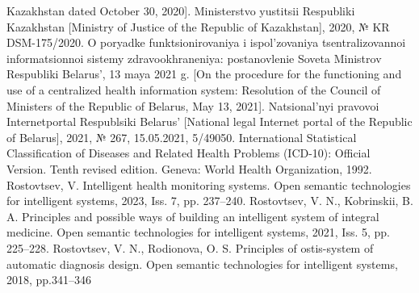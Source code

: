 \documentclass[10pt, a4paper]{article}
\begin{document}
\begin{multicols}{2}
\begin{thebibliography}{15}
        Kazakhstan dated October 30, 2020]. Ministerstvo yustitsii
        Respubliki Kazakhstan [Ministry of Justice of the Republic of
        Kazakhstan], 2020, № KR DSM-175/2020.
        \bibitem[11]{} O poryadke funktsionirovaniya i ispol’zovaniya tsentralizovannoi
        informatsionnoi sistemy zdravookhraneniya: postanovlenie Soveta
        Ministrov Respubliki Belarus’, 13 maya 2021 g. [On the procedure
        for the functioning and use of a centralized health information
        system: Resolution of the Council of Ministers of the Republic
        of Belarus, May 13, 2021]. Natsional’nyi pravovoi Internetportal Respublsiki Belarus’ [National legal Internet portal of the
        Republic of Belarus], 2021, № 267, 15.05.2021, 5/49050.
        \bibitem[12]{}  International Statistical Classification of Diseases and Related
        Health Problems (ICD-10): Official Version. Tenth revised edition. Geneva: World Health Organization, 1992.
        \bibitem[13]{}  Rostovtsev, V. Intelligent health monitoring systems. Open semantic technologies for intelligent systems, 2023, Iss. 7, pp. 237–240.
        \bibitem[14]{} Rostovtsev, V. N., Kobrinskii, B. A. Principles and possible ways
        of building an intelligent system of integral medicine. Open
        semantic technologies for intelligent systems, 2021, Iss. 5, pp.
        225–228.
        \bibitem[15]{}  Rostovtsev, V. N., Rodionova, O. S. Principles of ostis-system
        of automatic diagnosis design. Open semantic technologies for
        intelligent systems, 2018, pp.341–346
    \end{thebibliography}


\end{multicols}
\end{document}
